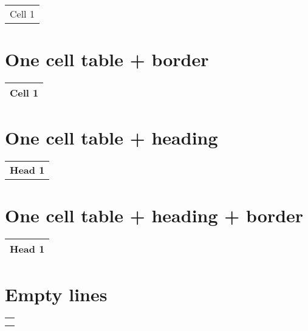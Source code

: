 \documentclass{article}
\begin{document}
\begin{center}\begin{tabular}{l}
Cell 1 \\
\end{tabular}\end{center}

\section*{One cell table + border}

\begin{center}\begin{tabular}{|l|}
\hline Cell 1 \\
\hline \end{tabular}\end{center}

\section*{One cell table + heading}

\begin{center}\begin{tabular}{l}
\textbf{Head 1} \\
\end{tabular}\end{center}

\section*{One cell table + heading + border}

\begin{center}\begin{tabular}{|l|}
\hline \textbf{Head 1} \\
\hline \end{tabular}\end{center}

\section*{Empty lines}

\begin{center}\begin{tabular}{|l|}
\hline  \\
\hline  \\
\hline  \\
\hline \end{tabular}\end{center}

\end{document}
